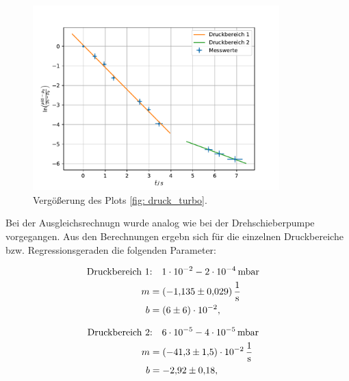 \FloatBarrier
\begin{figure}[h]
  \centering
  \includegraphics[width=0.85\textwidth]{../Messdaten/plots/turbo/druckplot_turbo_zoom.pdf}
  \caption{Vergößerung des Plots \ref{fig: druck_turbo}.}
  \label{fig: druck_turbo_zoom}
\end{figure}
\FloatBarrier
Bei der Ausgleichsrechnugn wurde analog wie bei der Drehschieberpumpe vorgegangen.
Aus den Berechnungen ergebn sich für die einzelnen Druckbereiche bzw. Regressionsgeraden die
folgenden Parameter:

\begin{align}
  \label{eq: regression_turbo_druck_1}
  \begin{aligned}
  \text{Druckbereich 1} &\text{:}\quad \num{1e-2} - \num{2e-4} \, \text{mbar}& \\
  m&=\SI{-1.135\pm0.029 }{\per\second} \\
  b&=\num{ 6 \pm 6 e-2 },
\end{aligned}
\end{align}

\begin{align}
  \label{eq: regression_turbo_druck_2}
  \begin{aligned}
  \text{Druckbereich 2} &\text{:}\quad \num{6e-5} - \num{4e-05} \, \text{mbar}& \\
  m&=\SI{-41.3\pm1.5 e-2}{\per\second} \\
  b&=\num{-2.92 \pm0.18 },
\end{aligned}
\end{align}


